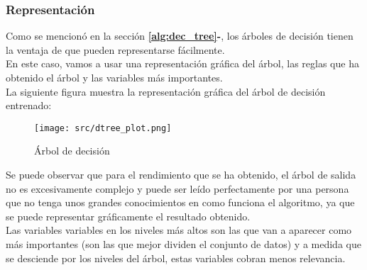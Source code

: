 \subsubsection*{Representación}
Como se mencionó en la sección \textbf{\ref{alg:dec_tree}-}, los árboles de decisión tienen la ventaja de que pueden representarse fácilmente. \\
En este caso, vamos a usar una representación gráfica del árbol, las reglas que ha obtenido el árbol y las variables más importantes.\\
\linebreak
La siguiente figura muestra la representación gráfica del árbol de decisión entrenado:
\begin{figure}[H]
	\texttt{[image: src/dtree\_plot.png]}
	\caption{Árbol de decisión}
	\label{fig:decission_tree1}
\end{figure}
Se puede observar que para el rendimiento que se ha obtenido, el árbol de salida no es excesivamente complejo y puede ser leído perfectamente por una persona que no tenga unos grandes conocimientos en como funciona el algoritmo, ya que se puede representar gráficamente el resultado obtenido. \\
\linebreak
Las variables variables en los niveles más altos son las que van a aparecer como más importantes (son las que mejor dividen el conjunto de datos) y a medida que se desciende por los niveles del árbol, estas variables cobran menos relevancia. \\
\linebreak

